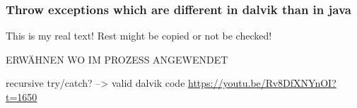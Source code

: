 \subsubsection{Throw exceptions which are different in dalvik than in java} \label{subsubsection:counter-reengineering-break-exception}
This is my real text! Rest might be copied or not be checked!

ERWÄHNEN WO IM PROZESS ANGEWENDET\newline


recursive try/catch? --> valid dalvik code\newline
\url{https://youtu.be/Rv8DfXNYnOI?t=1650}
